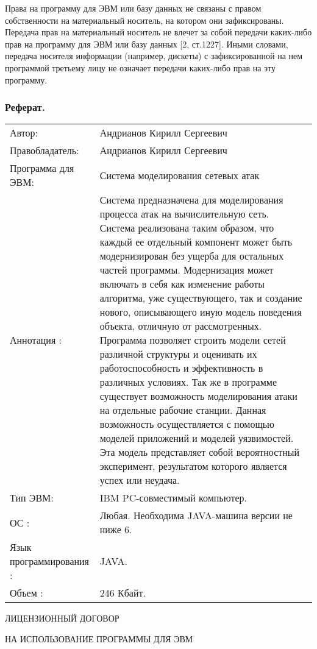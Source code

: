     Права на программу для ЭВМ или базу данных не связаны с правом собственности на материальный носитель, на котором они зафиксированы. Передача прав на материальный носитель не влечет за собой передачи каких-либо прав на программу для ЭВМ или базу данных [2, ст.1227]. Иными словами, передача носителя информации (например, дискеты) с зафиксированной на нем программой третьему лицу не означает передачи каких-либо прав на эту программу.

    

    \subsubsection*{Реферат.}

    \begin{tabular}{p{15em}p{25em}}
        Автор: & Андрианов Кирилл Сергеевич \\
        Правобладатель: & Андрианов Кирилл Сергеевич \\
        Программа для ЭВМ: & Система моделирования сетевых атак \\
        Аннотация : & Система предназначена для моделирования процесса атак на вычислительную сеть. Система реализована таким образом, что каждый ее отдельный компонент может быть модернизирован без ущерба для остальных частей программы. Модернизация может включать в себя как изменение работы алгоритма, уже существующего, так и создание нового, описывающего иную модель поведения объекта, отличную от рассмотренных. Программа позволяет строить модели сетей различной структуры и оценивать их работоспособность и эффективность в различных условиях. Так же в программе существует возможность моделирования атаки на отдельные рабочие станции. Данная возможность осуществляется с помощью моделей приложений и моделей уязвимостей. Эта модель представляет собой вероятностный эксперимент, результатом которого является успех или неудача. \\

        Тип ЭВМ: & IBM PC-совместимый компьютер. \\
        ОС : & Любая. Необходима JAVA-машина версии не ниже 6.\\
        Язык программирования : & JAVA. \\
        Объем : & 246 Кбайт.
    \end{tabular}

\newpage

\begin{center}
    ЛИЦЕНЗИОННЫЙ ДОГОВОР

    НА ИСПОЛЬЗОВАНИЕ ПРОГРАММЫ ДЛЯ ЭВМ
\end{center}

